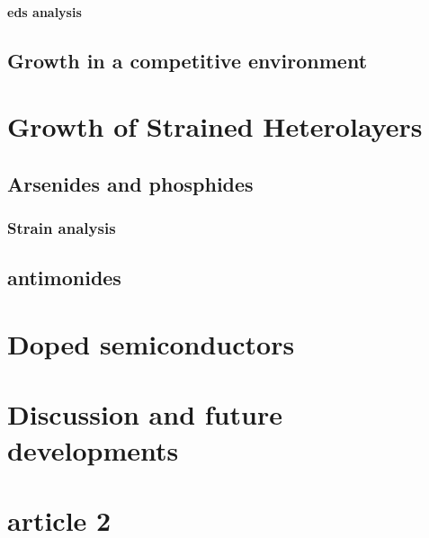 \paragraph{\acs{eds} analysis} 




\subsection{Growth in a competitive environment}
\section{Growth of Strained Heterolayers}
\subsection{Arsenides and phosphides}
\subsubsection{Strain analysis}
\subsection{antimonides}
\section{Doped semiconductors}

\section{Discussion and future developments}







\section{article 2}


